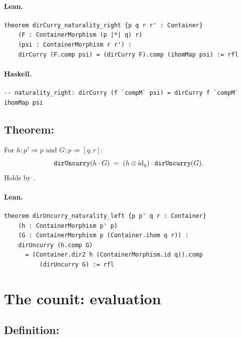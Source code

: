 \documentclass[11pt,a4paper]{article}
\begin{document}
\paragraph{Lean.}
\begin{lstlisting}[style=lean]
theorem dirCurry_naturality_right {p q r r' : Container}
    (F : ContainerMorphism (p |*| q) r)
    (psi : ContainerMorphism r r') :
    dirCurry (F.comp psi) = (dirCurry F).comp (ihomMap psi) := rfl
\end{lstlisting}

\paragraph{Haskell.}
\begin{lstlisting}[style=haskell]
-- naturality_right: dirCurry (f `compM` psi) = dirCurry f `compM` ihomMap psi
\end{lstlisting}


\subsection{Theorem: }

\begin{thm}
For $h : p' \Rightarrow p$ and $G : p \Rightarrow [q, r]$:
\[
  \texttt{dirUncurry}(h \cdot G)
  \;=\;
  (h \otimes \mathrm{id}_q) \cdot \texttt{dirUncurry}(G).
\]
Holds by .
\end{thm}

\paragraph{Lean.}
\begin{lstlisting}[style=lean]
theorem dirUncurry_naturality_left {p p' q r : Container}
    (h : ContainerMorphism p' p)
    (G : ContainerMorphism p (Container.ihom q r)) :
    dirUncurry (h.comp G)
      = (Container.dir2 h (ContainerMorphism.id q)).comp
          (dirUncurry G) := rfl
\end{lstlisting}


\section{The counit: evaluation}

\subsection{Definition: }
\end{document}
